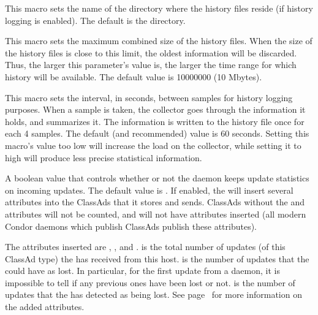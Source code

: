 \begin{description}
\label{param:PoolHistoryDir}
\item[\Macro{POOL\_HISTORY\_DIR}]
  This macro sets the name of the directory where the history
  files reside (if history logging is enabled).
  The default is the  directory.

\label{param:PoolHistoryMaxStorage} 
\item[\Macro{POOL\_HISTORY\_MAX\_STORAGE}]
  This macro sets the maximum combined size of the history files.
  When the size of the history files is close to this limit, the oldest
  information will be discarded.
  Thus, the larger this parameter's value is, the larger the time
  range for which history will be available.  The default value is
  10000000 (10 Mbytes).

\label{param:PoolHistorySamplingInterval}
\item[\Macro{POOL\_HISTORY\_SAMPLING\_INTERVAL}]
  This macro sets the interval, in seconds, between samples for
  history logging purposes. 
  When a sample is taken, the collector goes through the information
  it holds, and summarizes it.
  The information is written to the history file once for each 4
  samples.
  The default (and recommended) value is 60 seconds. Setting this
  macro's value too low will increase the load on the collector,
  while setting it to high will produce less precise statistical
  information.

\label{param:CollectorDaemonStats}
\item[\Macro{COLLECTOR\_DAEMON\_STATS}]
  A boolean value that controls whether or not the  daemon
  keeps update statistics on incoming updates.  
  The default value is .
  If enabled, the  will insert several attributes
  into the ClassAds that it stores and sends.  ClassAds without the
   and  attributes will not
  be counted, and will not have attributes inserted (all modern Condor
  daemons which publish ClassAds publish these attributes).

  The attributes inserted are , ,
  and .   is the total number of
  updates (of this ClassAd type) the  has received 
  from this host.
   is the number of updates that the 
  could have as lost.  In particular, for the first update from a
  daemon, it is impossible to tell if any previous ones have been lost or not.
   is the number of updates that the 
  has detected as being lost.
  See page~\pageref{sec:Collector-Added-Attributes} for more information on the
  added attributes.


\end{description}
